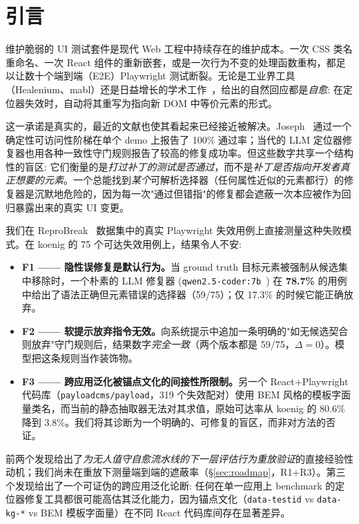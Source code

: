 \section{引言}
\label{sec:intro}

维护脆弱的 UI 测试套件是现代 Web 工程中持续存在的维护成本。一次 CSS 类名重命名、一次 React 组件的重新嵌套，或是一次行为不变的处理函数重构，都足以让数十个端到端（E2E）Playwright 测试断裂。无论是工业界工具（Healenium、mabl）还是日益增长的学术工作~\cite{joseph2026zerocost, mouraReproBreak2026, healenium}，给出的自然回应都是\emph{自愈}: 在定位器失效时，自动将其重写为指向新 DOM 中等价元素的形式。

这一承诺是真实的，最近的文献也使其看起来已经接近被解决。Joseph~\cite{joseph2026zerocost} 通过一个确定性可访问性阶梯在单个 demo 上报告了 100\% 通过率；当代的 LLM 定位器修复器也用各种一致性守门规则报告了较高的修复成功率。但这些数字共享一个结构性的盲区: 它们衡量的是\emph{打过补丁的测试是否通过}，而不是\emph{补丁是否指向开发者真正想要的元素}。一个总能找到\emph{某个}可解析选择器（任何属性近似的元素都行）的修复器是沉默地危险的，因为每一次"通过但错指"的修复都会遮蔽一次本应被作为回归暴露出来的真实 UI 变更。

我们在 ReproBreak~\cite{mouraReproBreak2026} 数据集中的真实 Playwright 失效用例上直接测量这种失败模式。在 koenig 的 75 个可达失效用例上，结果令人不安:

\begin{itemize}
\item \textbf{F1 —— 隐性误修复是默认行为。}当 ground truth 目标元素被强制从候选集中移除时，一个朴素的 LLM 修复器 (\texttt{qwen2.5-coder:7b}~\cite{qwenCoderTech2024}) 在 \textbf{78.7\%} 的用例中给出了语法正确但元素错误的选择器（59/75）；仅 17.3\% 的时候它能正确放弃。
\item \textbf{F2 —— 软提示放弃指令无效。}向系统提示中追加一条明确的"如无候选契合则放弃"守门规则后，结果数字\emph{完全一致}（两个版本都是 59/75，$\Delta=0$）。模型把这条规则当作装饰物。
\item \textbf{F3 —— 跨应用泛化被锚点文化的间接性所限制。}另一个 React+Playwright 代码库（\texttt{payloadcms/payload}，319 个失效配对）使用 BEM 风格的模板字面量类名，而当前的静态抽取器无法对其求值，原始可达率从 koenig 的 80.6\% 降到 3.8\%。我们将其诊断为一个明确的、可修复的盲区，而非对方法的否证。
\end{itemize}

\noindent 前两个发现给出了\emph{为无人值守自愈流水线的下一层评估行为重放验证}的直接经验性动机；我们尚未在重放下测量端到端的遮蔽率（\S\ref{sec:roadmap}，R1+R3）。第三个发现给出了一个可证伪的跨应用泛化论断: 任何在单一应用上 benchmark 的定位器修复工具都很可能高估其泛化能力，因为锚点文化（\texttt{data-testid} vs \texttt{data-kg-*} vs BEM 模板字面量）在不同 React 代码库间存在显著差异。

